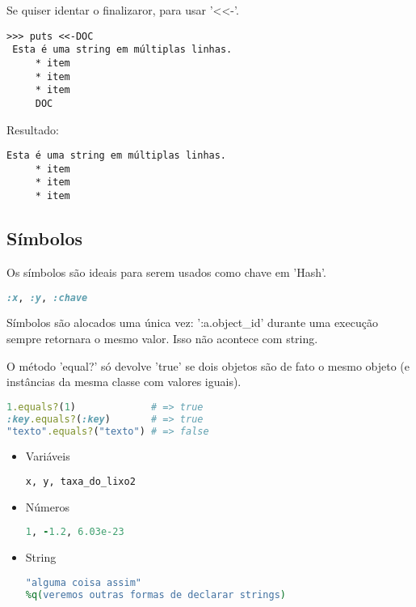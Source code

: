 \documentclass[serif,mathserif]{article}
\begin{document}
Se quiser identar o finalizaror, para usar '<<-'.

\begin{lstlisting}[style=BashOutputStyle]
>>> puts <<-DOC
 Esta é uma string em múltiplas linhas.
     * item
     * item
     * item
     DOC
\end{lstlisting}

Resultado:
 \begin{lstlisting}[style=BashOutputStyle]
 Esta é uma string em múltiplas linhas.
     * item
     * item
     * item 
 \end{lstlisting}

\subsection{Símbolos}

Os símbolos são ideais para serem usados como chave em 'Hash'.

\begin{lstlisting}[language=ruby]
:x, :y, :chave
\end{lstlisting}

Símbolos são alocados uma única vez: ':a.object\_id' durante uma execução sempre retornara o mesmo valor. Isso não acontece com string.

O método 'equal?' só devolve 'true' se dois objetos são de fato o mesmo objeto (e instâncias da mesma classe com valores iguais).

\begin{lstlisting}[language=ruby]
1.equals?(1)             # => true
:key.equals?(:key)       # => true
"texto".equals?("texto") # => false
\end{lstlisting}

\begin{itemize}
  \item Variáveis 
\begin{lstlisting}[language=ruby]
x, y, taxa_do_lixo2
\end{lstlisting} 
   \item{Números}
\begin{lstlisting}[language=ruby]
1, -1.2, 6.03e-23    
\end{lstlisting}
	\item {String}
\begin{lstlisting}[language=ruby]
"alguma coisa assim"
%q(veremos outras formas de declarar strings)
\end{lstlisting}
 
\end{itemize}
\end{document}
